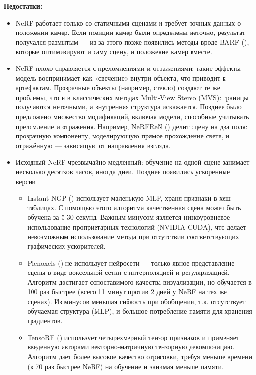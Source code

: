 \textbf{Недостатки:}
\begin{itemize}
	\item NeRF работает только со статичными сценами и требует точных данных о
	положении камер. Если позиции камер были определены неточно, результат
	получался размытым — из-за этого позже появились методы вроде BARF
	(\cite{lin2021barfbundleadjustingneuralradiance}), которые оптимизируют и саму
	сцену, и положение камер вместе.
	\item NeRF плохо справляется с преломлениями и отражениями: такие
	эффекты модель воспринимает как «свечение» внутри объекта, что приводит к
	артефактам. Прозрачные объекты (например, стекло) создают те же проблемы,
	что и в классических методах Multi-View Stereo (MVS): границы получаются
	неточными, а внутренняя структура искажается. Позднее было предложено
	множество модификаций, включая модели, способные учитывать преломление и
	отражения. Например, NeRFReN (\cite{guo2022nerfrenneuralradiancefields}) делит сцену
	на два поля: прозрачную компоненту, моделирующую прямое прохождение света, и
	отражённую — зависящую от направления взгляда.
	\item Исходный NeRF чрезвычайно медленный: обучение на одной сцене
	занимает несколько десятков часов, иногда дней. Позднее появились ускоренные версии
	\begin{itemize}
		\item Instant-NGP (\cite{M_ller_2022}) использует маленькую MLP, храня признаки в хеш-таблицах.
		С помощью этого алгоритма качественная сцена может быть обучена за 5-30 секунд.
		Важным минусом является низкоуровневое использование проприетарных технологий (NVIDIA CUDA),
		что делает невозможным использование метода при отсутствии соответствующих графических
		ускорителей.
		\item Plenoxels (\cite{yu2021plenoxelsradiancefieldsneural}) не использует
		нейросети — только явное представление сцены в виде воксельной сетки с
		интерполяцией и регуляризацией. Алгоритм достигает сопоставимого качества
		визуализации, но обучается в 100 раз быстрее (всего 11 минут против 2 дней у
		NeRF на тех же сценах). Из минусов меньшая гибкость при обобщении, т.к.
		отсутствует обучаемая структура (MLP), и большое потребление памяти для
		хранения градиентов.
		\item TensoRF (\cite{chen2022tensorftensorialradiancefields}) использует
		четырехмерный тензор признаков и применяет введенную авторами
		векторно-матричную тензорную декомпозицию. Алгоритм дает более высокое качество отрисовки,
		требуя меньше времени (в 70 раз быстрее NeRF) на обучение и занимая меньше памяти.
	\end{itemize}
\end{itemize}

